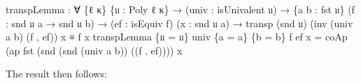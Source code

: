 \documentclass[
  11pt,
  oneside,
  article]{memoir}
\newenvironment{Shaded}{}{}
\newcommand{\NormalTok}[1]{#1}
\newcommand{\OtherTok}[1]{\textcolor[rgb]{0.00,0.44,0.13}{#1}}
\theoremstyle{definition}
\theoremstyle{plain}
\newcommand{\0}{\textsf{0}}
\newcommand{\1}{\tn{\textsf{1}}}
\begin{document}
\begin{Shaded}
\begin{Highlighting}[]
\NormalTok{transpLemma }\OtherTok{:} \OtherTok{∀} \OtherTok{\{}\NormalTok{ℓ κ}\OtherTok{\}} \OtherTok{\{}\NormalTok{𝔲 }\OtherTok{:}\NormalTok{ Poly ℓ κ}\OtherTok{\}}
              \OtherTok{→} \OtherTok{(}\NormalTok{univ }\OtherTok{:}\NormalTok{ isUnivalent 𝔲}\OtherTok{)} 
              \OtherTok{→} \OtherTok{\{}\NormalTok{a b }\OtherTok{:}\NormalTok{ fst 𝔲}\OtherTok{\}} \OtherTok{(}\NormalTok{f }\OtherTok{:}\NormalTok{ snd 𝔲 a }\OtherTok{→}\NormalTok{ snd 𝔲 b}\OtherTok{)}
              \OtherTok{→} \OtherTok{(}\NormalTok{ef }\OtherTok{:}\NormalTok{ isEquiv f}\OtherTok{)} \OtherTok{(}\NormalTok{x }\OtherTok{:}\NormalTok{ snd 𝔲 a}\OtherTok{)}
              \OtherTok{→}\NormalTok{ transp }\OtherTok{(}\NormalTok{snd 𝔲}\OtherTok{)} \OtherTok{(}\NormalTok{inv }\OtherTok{(}\NormalTok{univ a b}\OtherTok{)} \OtherTok{(}\NormalTok{f , ef}\OtherTok{))}\NormalTok{ x ≡ f x}
\NormalTok{transpLemma }\OtherTok{\{}\NormalTok{𝔲 }\OtherTok{=}\NormalTok{ 𝔲}\OtherTok{\}}\NormalTok{ univ }\OtherTok{\{}\NormalTok{a }\OtherTok{=}\NormalTok{ a}\OtherTok{\}} \OtherTok{\{}\NormalTok{b }\OtherTok{=}\NormalTok{ b}\OtherTok{\}}\NormalTok{ f ef x }\OtherTok{=} 
\NormalTok{    coAp }\OtherTok{(}\NormalTok{ap fst }\OtherTok{(}\NormalTok{snd }\OtherTok{(}\NormalTok{snd }\OtherTok{(}\NormalTok{univ a b}\OtherTok{))} \OtherTok{((}\NormalTok{f , ef}\OtherTok{))))}\NormalTok{ x}
\end{Highlighting}
\end{Shaded}

The result then follows:
\end{document}
